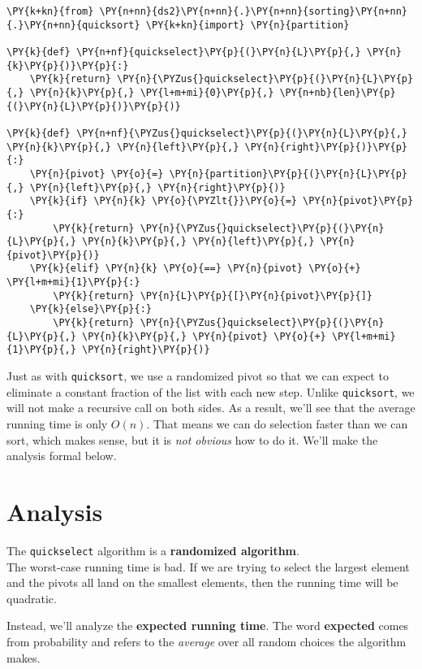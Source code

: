 \begin{Verbatim}[commandchars=\\\{\}]
\PY{k+kn}{from} \PY{n+nn}{ds2}\PY{n+nn}{.}\PY{n+nn}{sorting}\PY{n+nn}{.}\PY{n+nn}{quicksort} \PY{k+kn}{import} \PY{n}{partition}

\PY{k}{def} \PY{n+nf}{quickselect}\PY{p}{(}\PY{n}{L}\PY{p}{,} \PY{n}{k}\PY{p}{)}\PY{p}{:}
    \PY{k}{return} \PY{n}{\PYZus{}quickselect}\PY{p}{(}\PY{n}{L}\PY{p}{,} \PY{n}{k}\PY{p}{,} \PY{l+m+mi}{0}\PY{p}{,} \PY{n+nb}{len}\PY{p}{(}\PY{n}{L}\PY{p}{)}\PY{p}{)}

\PY{k}{def} \PY{n+nf}{\PYZus{}quickselect}\PY{p}{(}\PY{n}{L}\PY{p}{,} \PY{n}{k}\PY{p}{,} \PY{n}{left}\PY{p}{,} \PY{n}{right}\PY{p}{)}\PY{p}{:}
    \PY{n}{pivot} \PY{o}{=} \PY{n}{partition}\PY{p}{(}\PY{n}{L}\PY{p}{,} \PY{n}{left}\PY{p}{,} \PY{n}{right}\PY{p}{)}
    \PY{k}{if} \PY{n}{k} \PY{o}{\PYZlt{}}\PY{o}{=} \PY{n}{pivot}\PY{p}{:}
        \PY{k}{return} \PY{n}{\PYZus{}quickselect}\PY{p}{(}\PY{n}{L}\PY{p}{,} \PY{n}{k}\PY{p}{,} \PY{n}{left}\PY{p}{,} \PY{n}{pivot}\PY{p}{)}
    \PY{k}{elif} \PY{n}{k} \PY{o}{==} \PY{n}{pivot} \PY{o}{+} \PY{l+m+mi}{1}\PY{p}{:}
        \PY{k}{return} \PY{n}{L}\PY{p}{[}\PY{n}{pivot}\PY{p}{]}
    \PY{k}{else}\PY{p}{:}
        \PY{k}{return} \PY{n}{\PYZus{}quickselect}\PY{p}{(}\PY{n}{L}\PY{p}{,} \PY{n}{k}\PY{p}{,} \PY{n}{pivot} \PY{o}{+} \PY{l+m+mi}{1}\PY{p}{,} \PY{n}{right}\PY{p}{)}
\end{Verbatim}



Just as with \texttt{quicksort}, we use a randomized pivot so that we can expect to eliminate a constant fraction of the list with each new step.  Unlike \texttt{quicksort}, we will not make a recursive call on both sides.  As a result, we'll see that the average running time is only $O(n)$.  That means we can do selection faster than we can sort, which makes sense, but it is \emph{not obvious} how to do it.
We'll make the analysis formal below.

\section{Analysis}


The \texttt{quickselect} algorithm is a \textbf{randomized algorithm}.\\
The worst-case running time is bad.  If we are trying to select the largest element and the pivots all land on the smallest elements, then the running time will be quadratic.  


Instead, we'll analyze the \textbf{expected running time}. The word \textbf{expected} comes from probability and refers to the \emph{average} over all random choices the algorithm makes.


